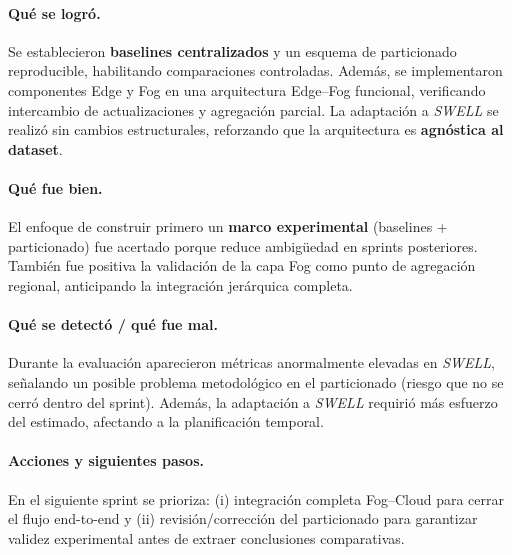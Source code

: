 \documentclass{report}
\begin{document}
\vspace{0.15em}
\paragraph{Qué se logró.}
Se establecieron \textbf{baselines centralizados} y un esquema de particionado reproducible, habilitando comparaciones controladas. Además, se implementaron componentes Edge y Fog en una arquitectura Edge--Fog funcional, verificando intercambio de actualizaciones y agregación parcial. La adaptación a \textit{SWELL} se realizó sin cambios estructurales, reforzando que la arquitectura es \textbf{agnóstica al dataset}.

\vspace{0.15em}
\paragraph{Qué fue bien.}
El enfoque de construir primero un \textbf{marco experimental} (baselines + particionado) fue acertado porque reduce ambigüedad en sprints posteriores. También fue positiva la validación de la capa Fog como punto de agregación regional, anticipando la integración jerárquica completa.

\vspace{0.15em}
\paragraph{Qué se detectó / qué fue mal.}
Durante la evaluación aparecieron métricas anormalmente elevadas en \textit{SWELL}, señalando un posible problema metodológico en el particionado (riesgo que no se cerró dentro del sprint). Además, la adaptación a \textit{SWELL} requirió más esfuerzo del estimado, afectando a la planificación temporal.

\vspace{0.15em}
\paragraph{Acciones y siguientes pasos.}
En el siguiente sprint se prioriza: (i) integración completa Fog--Cloud para cerrar el flujo end-to-end y (ii) revisión/corrección del particionado para garantizar validez experimental antes de extraer conclusiones comparativas.
\end{document}
